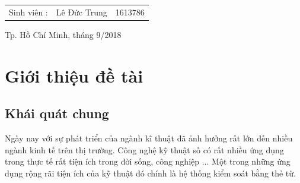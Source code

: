 \documentclass[12pt,titlepage,a4paper]{article}
\begin{document}
\begin{titlepage}
\begin{table}[h]
\begin{tabular}{ll}
\end{tabular}
\end{table}
\vspace{0.5cm}
\begin{table}[h]
\begin{tabular}{lll}

\hspace{4.75cm} Sinh viên :& Lê Đức Trung & 1613786\\


\end{tabular}

\end{table}
\vspace{2cm}
\begin{center}
{\footnotesize Tp. Hồ Chí Minh, tháng 9/2018}
\end{center}
\end{titlepage}

\newpage
\thispagestyle{empty}
\tableofcontents








\newpage
\section{Giới thiệu đề tài}
\subsection{Khái quát chung}
Ngày nay với sự phát triển của ngành kĩ thuật đã ảnh hưởng rất lớn đến nhiều ngành kinh tế trên thị trường. Công nghệ kỹ thuật số có rất nhiều ứng dụng trong thực tế rất tiện ích trong đời sống, công nghiệp ... Một trong những ứng dụng rộng rãi tiện ích của kỹ thuật đó chính là hệ thống kiểm soát bằng thẻ từ.\\
\end{document}
